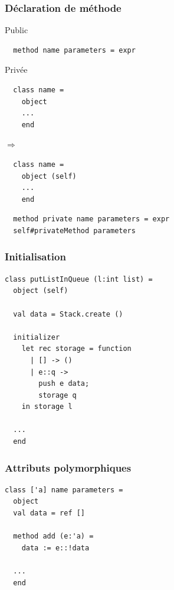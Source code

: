 \begin{frame}[fragile]
	\frametitle{Déclaration de méthode}
	\begin{block}{Public}
		\begin{lstlisting}
  method name parameters = expr
		\end{lstlisting}
	\end{block}
	\begin{block}{Privée}
		\begin{minipage}{0.4\textwidth}
  			\begin{lstlisting}
  class name =
    object
    ...
    end
			\end{lstlisting}
		\end{minipage}$\Rightarrow$
		\begin{minipage}{0.4\textwidth}
			\begin{lstlisting}
  class name =
    object (self)
    ...
    end
			\end{lstlisting}
		\end{minipage}
	\end{block}
	\begin{lstlisting}
  method private name parameters = expr
  self#privateMethod parameters
	\end{lstlisting}
\end{frame}

\begin{frame}[fragile]
	\frametitle{Initialisation}
	\begin{lstlisting}
class putListInQueue (l:int list) =
  object (self)
    
  val data = Stack.create ()

  initializer
    let rec storage = function
      | [] -> ()
      | e::q -> 
        push e data;
        storage q
    in storage l

  ...
  end
	\end{lstlisting}
\end{frame}

\begin{frame}[fragile]
	\frametitle{Attributs polymorphiques}
	\begin{lstlisting}
class ['a] name parameters =
  object 
  val data = ref []

  method add (e:'a) =
    data := e::!data
  
  ...
  end
	\end{lstlisting}
\end{frame}

